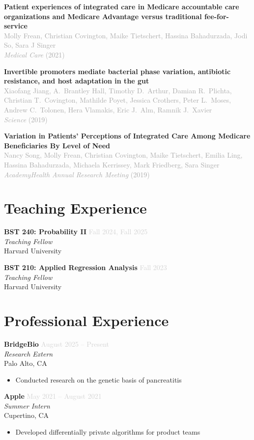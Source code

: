 \documentclass[11pt,a4paper]{article}
\newcommand{\cvitem}[4]{
    \noindent\textbf{#1} \hfill \textcolor{lightgray}{#2} \\
    \textit{#3} \\
    #4 \vspace{6pt}
}
\newcommand{\cvpub}[2]{
    \vspace{4pt}
    \noindent\textbf{#1} \\
    \textcolor{darkgray}{#2} \vspace{2pt}
}
\begin{document}
\cvpub{Patient experiences of integrated care in Medicare accountable care organizations and Medicare Advantage versus traditional fee-for-service}
      {Molly Frean, Christian Covington, Maike Tietschert, Hassina Bahadurzada, Jodi So, Sara J Singer \\ 
      \textit{Medical Care} (2021)}

\cvpub{Invertible promoters mediate bacterial phase variation, antibiotic resistance, and host adaptation in the gut}
      {Xiaofang Jiang, A.\ Brantley Hall, Timothy D.\ Arthur, Damian R.\ Plichta, Christian T.\ Covington, Mathilde Poyet, Jessica Crothers, Peter L.\ Moses, Andrew C.\ Tolonen, Hera Vlamakis, Eric J.\ Alm, Ramnik J.\ Xavier \\ 
      \textit{Science} (2019)}

\cvpub{Variation in Patients' Perceptions of Integrated Care Among Medicare Beneficiaries By Level of Need}
      {Nancy Song, Molly Frean, Christian Covington, Maike Tietschert, Emilia Ling, Hassina Bahadurzada, Michaela Kerrissey, Mark Friedberg, Sara Singer \\ 
      \textit{AcademyHealth Annual Research Meeting} (2019)}

\section{Teaching Experience}

\cvitem{BST 240: Probability II}{Fall 2024, Fall 2025}{Teaching Fellow}{Harvard University}

\cvitem{BST 210: Applied Regression Analysis}{Fall 2023}{Teaching Fellow}{Harvard University}

\section{Professional Experience}

\cvitem{BridgeBio}{August 2025 -- Present}{Research Extern}{Palo Alto, CA}
\begin{itemize}
    \item Conducted research on the genetic basis of pancreatitis
\end{itemize}

\cvitem{Apple}{May 2021 -- August 2021}{Summer Intern}{
    Cupertino, CA
    \begin{itemize}
        \item Developed differentially private algorithms for product teams
    \end{itemize}
}
\end{document}
